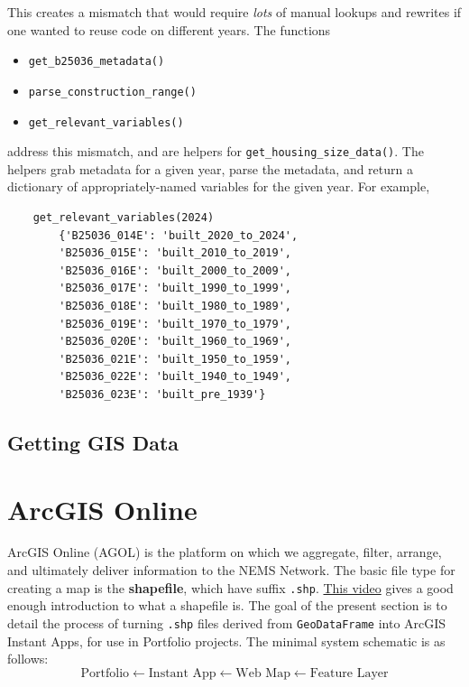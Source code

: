 \documentclass{article}
\begin{document}
This creates a mismatch that would require \textit{lots} of manual lookups and rewrites
if one wanted to reuse code on different years.
The functions
\begin{itemize}
    \item \verb|get_b25036_metadata()|
    \item \verb|parse_construction_range()|
    \item \verb|get_relevant_variables()|
\end{itemize}
address this mismatch, and are helpers for \verb|get_housing_size_data()|.
The helpers grab metadata for a given year, parse the metadata, and return a dictionary
of appropriately-named variables for the given year.
For example, 
\begin{verbatim}
    get_relevant_variables(2024)
        {'B25036_014E': 'built_2020_to_2024',
        'B25036_015E': 'built_2010_to_2019',
        'B25036_016E': 'built_2000_to_2009',
        'B25036_017E': 'built_1990_to_1999',
        'B25036_018E': 'built_1980_to_1989',
        'B25036_019E': 'built_1970_to_1979',
        'B25036_020E': 'built_1960_to_1969',
        'B25036_021E': 'built_1950_to_1959',
        'B25036_022E': 'built_1940_to_1949',
        'B25036_023E': 'built_pre_1939'}
\end{verbatim}







\subsection{Getting GIS Data}














\pagebreak

\section{ArcGIS Online}
ArcGIS Online (AGOL) is the platform on which we aggregate, filter, arrange, and ultimately deliver
information to the NEMS Network.
The basic file type for creating a map is the \textbf{shapefile}, which have suffix \verb|.shp|.
\href{https://www.youtube.com/watch?v=PfbjoAcQp8I&t=20s}{This video} gives a good enough introduction
to what a shapefile is.
The goal of the present section is to detail the process of turning \verb|.shp| files derived from \verb|GeoDataFrame|
into ArcGIS Instant Apps, for use in Portfolio projects.
The minimal system schematic is as follows:
\[
\text{Portfolio} \longleftarrow 
\text{Instant App} \longleftarrow 
\text{Web Map} \longleftarrow 
\text{Feature Layer} 
\]
\end{document}
